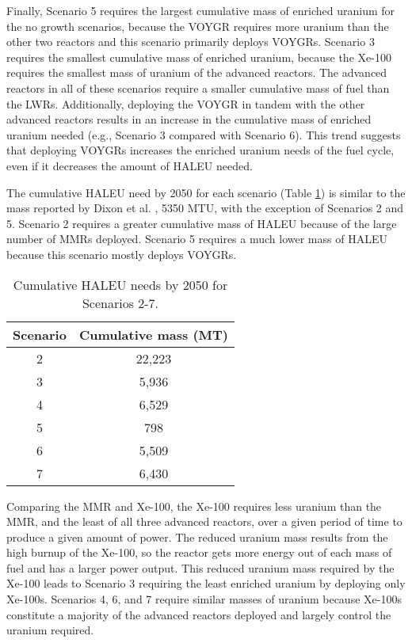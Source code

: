 Finally, Scenario 5 requires the largest cumulative mass of enriched uranium 
for the no growth scenarios, because the VOYGR requires more uranium than 
the other two reactors and this scenario primarily deploys VOYGRs. Scenario 3 
requires the smallest cumulative 
mass of enriched uranium, because the Xe-100 requires the smallest mass of 
uranium of the advanced reactors. The advanced reactors 
in all of these scenarios require a smaller cumulative mass of fuel than 
the \glspl{LWR}. Additionally, deploying the VOYGR in tandem with the other 
advanced reactors results in an increase in the cumulative mass 
of enriched uranium needed (e.g., Scenario 3 compared with Scenario 6). This
trend suggests that deploying VOYGRs increases the enriched uranium needs 
of the fuel cycle, even if it decreases the amount of \gls{HALEU} needed. 

The cumulative \gls{HALEU} need by 2050 for each scenario (Table 
\ref{tab:nogrowth_haleu}) is similar to the mass reported by 
Dixon et al. \cite{dixon_estimated_2022}, 5350 MTU, with the exception 
of Scenarios 2 and 5. Scenario 2 requires a greater cumulative mass of 
\gls{HALEU} because of the large number of \glspl{MMR} deployed. Scenario 
5 requires a much lower mass of \gls{HALEU} because this scenario mostly 
deploys VOYGRs. 

\begin{table}[h!]
    \centering 
    \caption{Cumulative HALEU needs by 2050 for Scenarios 2-7.}
    \label{tab:nogrowth_haleu}
    \begin{tabular}{c c}
        \hline 
        Scenario & Cumulative mass (MT) \\
        \hline
        2 & 22,223\\
        3 & 5,936 \\
        4 & 6,529 \\
        5 & 798 \\
        6 & 5,509 \\
        7 & 6,430 \\
        \hline        
    \end{tabular}
\end{table}

Comparing the \gls{MMR} and Xe-100, the Xe-100 requires less uranium than 
the \gls{MMR},
and the least of all three advanced reactors, over a given period of time 
to produce a given amount of power. The reduced uranium mass results 
from the high burnup of the Xe-100, so the reactor gets more energy out of 
each mass of fuel and has a larger power output. This reduced uranium mass 
required by the Xe-100 leads to Scenario 3 requiring the least 
enriched uranium by deploying only Xe-100s. Scenarios 4, 6, and 7 require similar 
masses of uranium because Xe-100s constitute a majority of the advanced 
reactors deployed and largely control the uranium required. 

